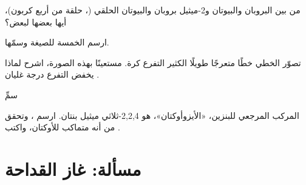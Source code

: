 \begin{exercise}[$\star\star$]\label{exo:g11:organic-skeletons:11}
من بين البروبان والبيوتان و2-ميثيل بروبان والبيوتان الحلقي (، حلقة
من أربع  كربون)، أيها  بعضها لبعض؟
\end{exercise}

\begin{exercise}[$\star\star\star$]\label{exo:g11:organic-skeletons:12}
ارسم  الخمسة للصيغة  وسمّها.
\end{exercise}

\begin{exercise}[$\star\star\star$]\label{exo:g11:organic-skeletons:13}
تصوّر  الخطي خطًا متعرجًا طويلًا  الكثير التفرع كرة. مستعينًا بهذه
الصورة، اشرح لماذا يخفض التفرع درجة غليان
.
\end{exercise}

\begin{exercise}[$\star\star\star$]\label{exo:g11:organic-skeletons:14}
سمِّ 
\begin{center}
\end{center}
\end{exercise}

\begin{exercise}[$\star\star\star$]\label{exo:g11:organic-skeletons:15}
المركب المرجعي للبنزين، «الأيزوأوكتان»، هو
2,2,4-ثلاثي ميثيل بنتان. ارسم ، وتحقق من أنه
متماكب للأوكتان، واكتب .
\end{exercise}

\section{مسألة: غاز القداحة}

